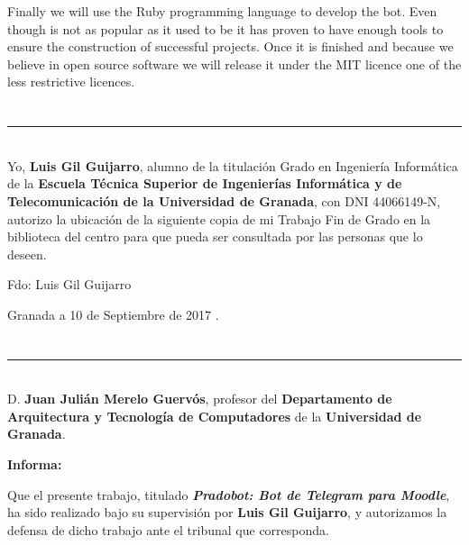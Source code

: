 Finally we will use the Ruby programming language to develop the bot. Even though is not as popular as it used to be it has proven to have enough tools to ensure the construction of successful projects. Once it is finished and  because we believe in open source software we will release it under the MIT licence one of the less restrictive licences. 


\chapter*{}
\thispagestyle{empty}

\noindent\rule[-1ex]{\textwidth}{2pt}\\[4.5ex]

Yo, \textbf{Luis Gil Guijarro}, alumno de la titulación Grado en Ingeniería Informática de la \textbf{Escuela Técnica Superior
de Ingenierías Informática y de Telecomunicación de la Universidad de Granada}, con DNI 44066149-N, autorizo la
ubicación de la siguiente copia de mi Trabajo Fin de Grado en la biblioteca del centro para que pueda ser
consultada por las personas que lo deseen.

\vspace{6cm}

\noindent Fdo: Luis Gil Guijarro

\vspace{2cm}

\begin{flushright}
Granada a 10 de Septiembre de 2017 .
\end{flushright}


\chapter*{}
\thispagestyle{empty}

\noindent\rule[-1ex]{\textwidth}{2pt}\\[4.5ex]

D. \textbf{Juan Julián Merelo Guervós}, profesor del \textbf{Departamento de Arquitectura y Tecnología de Computadores} de la \textbf{Universidad de Granada}.


\vspace{0.5cm}

\textbf{Informa:}

\vspace{0.5cm}

Que el presente trabajo, titulado \textit{\textbf{Pradobot: Bot de Telegram para Moodle}},
ha sido realizado bajo su supervisión por \textbf{Luis Gil Guijarro}, y autorizamos la defensa de dicho trabajo ante el tribunal
que corresponda.

